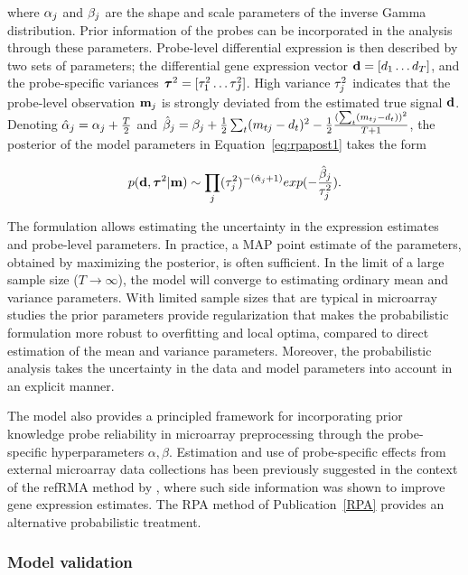 \noindent where \(\alpha_j\) and \(\beta_j\) are the shape and scale parameters of
the inverse Gamma distribution. Prior information of the probes can be
incorporated in the analysis through these parameters. Probe-level
differential expression is then described by two sets of parameters;
the differential gene expression vector \(\mathbf{d} = [d_1 \dots d_T]\), and
the probe-specific variances \(\boldsymbol{\tau}^2 = [\tau^2_1 \dots \tau^2_J]\).
High variance \(\mathbf{\tau}_j^2\) indicates that the probe-level observation
\(\mathbf{m}_j\) is strongly deviated from the estimated true signal
\(\mathbf{d}\). Denoting \(\hat{\alpha}_j = \alpha_j + \frac{T}{2}\) and
\(\hat{\beta}_j = \beta_j + \frac{1}{2}\sum_t (m_{tj} - d_t)^2 -
\frac{1}{2}\frac{(\sum_t (m_{tj} - d_t))^2}{T+1}\), the posterior of the
model parameters in Equation~\ref{eq:rpapost1} takes the form

\begin{equation}
\label{eq:fullpost}
p(\mathbf{d}, \boldsymbol{\tau}^2 | \mathbf{m}) \sim \prod_j (\mathbf{\tau}_j^2)^{-(\hat{\alpha}_j + 1)} exp(-\frac{\hat{\beta}_j}{\mathbf{\tau}_j^2}).
\end{equation}

\noindent The formulation allows estimating the uncertainty in the
expression estimates and probe-level parameters.  In practice, a MAP
point estimate of the parameters, obtained by maximizing the
posterior, is often sufficient. In the limit of a large sample size
(\(T \rightarrow \infty\)), the model will converge to estimating
ordinary mean and variance parameters. With limited sample sizes that
are typical in microarray studies the prior parameters provide
regularization that makes the probabilistic formulation more robust to
overfitting and local optima, compared to direct estimation of the
mean and variance parameters. Moreover, the probabilistic analysis
takes the uncertainty in the data and model parameters into account in
an explicit manner.

The model also provides a principled framework for incorporating prior
knowledge probe reliability in microarray preprocessing through the
probe-specific hyperparameters \(\alpha, \beta\). Estimation and use
of probe-specific effects from external microarray data collections
has been previously suggested in the context of the refRMA method by
\cite{Katz06}, where such side information was shown to improve gene
expression estimates. The RPA method of Publication~\ref{RPA} provides
an alternative probabilistic treatment.

\subsubsection{Model validation}

